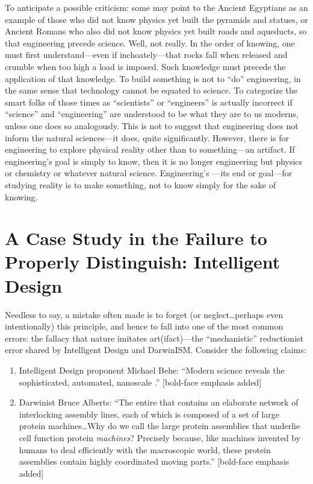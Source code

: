 To anticipate a possible criticism: some may point to the Ancient Egyptians as an example of those who did not know physics yet built the pyramids and statues, or Ancient Romans who also did not know physics yet built roads and aqueducts, so that engineering  precede science. Well, not really. In the order of knowing, one must first understand---even if inchoately---that rocks fall when released and crumble when too high a load is imposed. Such knowledge must precede the application of that knowledge. To build something is not to ``do'' engineering, in the same sense that technology cannot be equated to science. To categorize the smart folks of those times as ``scientists'' or ``engineers'' is actually incorrect if ``science'' and ``engineering'' are understood to be what they are to us moderns, unless one does so analogously. This is not to suggest that engineering does not inform the natural sciences---it does, quite significantly. However, there is  for engineering to explore physical reality other than to  something---an artifact. If engineering's goal is simply to know, then it is no longer engineering but physics or chemistry or whatever natural science. Engineering's ---its end or goal---for studying reality is to make something, not to know simply for the sake of knowing.

\section{A Case Study in the Failure to Properly Distinguish: Intelligent Design}

Needless to say, a mistake often made is to forget (or neglect\ldots perhaps even intentionally) this principle, and hence to fall into one of the most common errors: the fallacy that nature imitates art(ifact)---the ``mechanistic'' reductionist error shared by Intelligent Design and DarwinISM. Consider the following claims:

\begin{enumerate}
\item Intelligent Design proponent Michael Behe: ``Modern science reveals the  sophisticated, automated, nanoscale .''\cite{beheinterview} [bold-face emphasis added]
\item Darwinist Bruce Alberts: ``The entire  that contains an elaborate network of interlocking assembly lines, each of which is composed of a set of large protein machines\ldots Why do we call the large protein assemblies that underlie cell function protein \emph{machines}? Precisely because, like machines invented by humans to deal efficiently with the macroscopic world, these protein assemblies contain highly coordinated moving parts.''\cite{balberts} [bold-face emphasis added]
\end{enumerate}

